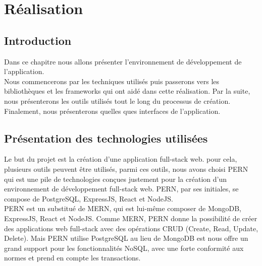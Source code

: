 \chapter{Réalisation}

\section{Introduction}
    Dans ce chapitre nous allons présenter l'environnement de développement de l'application.\\

    Nous commencerons par les techniques utilisés puis passerons vers les bibliothèques et les frameworks qui ont aidé dans cette réalisation. Par la suite, nous présenterons les outils utilisés tout le long du processus de création.\\

    Finalement, nous présenterons quelles ques interfaces de l'application.\\

\section{Présentation des technologies utilisées}
    Le but du projet est la création d'une application full-stack web. pour cela, plusieurs outils peuvent être utilisés, parmi ces outils, nous avons choisi \acs{PERN} qui est une pile de technologies conçues justement pour la création d'un environnement de développement full-stack web. \acs{PERN}, par ses initiales, se compose de PostgreSQL, ExpressJS, React et NodeJS.\\

    \acs{PERN} est un substitué de \acs{MERN}, qui est lui-même composer de MongoDB, ExpressJS, React et NodeJS. Comme \acs{MERN}, \acs{PERN} donne la possibilité de créer des applications web full-stack avec des opérations \acs{CRUD} (Create, Read, Update, Delete). Mais \acs{PERN} utilise PostgreSQL au lieu de MongoDB est nous offre un grand support pour les fonctionnalités \acs{NoSQL}, avec une forte conformité aux normes et prend en compte les transactions.\\

